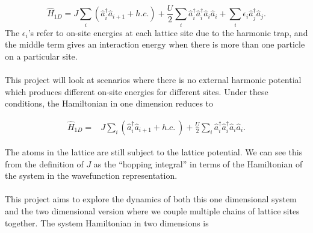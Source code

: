 \documentclass[a4paper,10pt]{article}
\begin{document}
\begin{equation}
 \hat{H}_{1D}=J\sum_{i}(\hat{a}^\dagger_{i}\hat{a}_{i+1}+h.c.)+\frac{U}{2}\sum_{i}\hat{a}^\dagger_{i}\hat{a}^\dagger_{i}\hat{a}_{i}\hat{a}_{i}+\sum_{i}{\epsilon_i}\hat{a}^\dagger_{j}\hat{a}_{j}.
\end{equation}
The $\epsilon_i$'s refer to on-site energies at each lattice site due to the harmonic trap, and the middle term gives an interaction energy when there is more than one particle 
on a particular site.
\\\\
This project will look at scenarios where there is no external harmonic potential which produces different on-site energies for different sites.  
Under these conditions, the Hamiltonian in one dimension reduces to

\begin{equation}
\begin{align*}
\hat{H}_{1D}=&J\sum_{i}(\hat{a}^\dagger_{i}\hat{a}_{i+1}+h.c.\ ) +\frac{U}{2}\sum_{i}\hat{a}^\dagger_{i}\hat{a}^\dagger_{i}\hat{a}_{i}\hat{a}_{i}.
\end{align*}
\end{equation}

The atoms in the lattice are still subject to the lattice potential. We can see this from the definition of $J$ as the ``hopping integral'' in terms of the Hamiltonian of
the system in the wavefunction representation.
\\\\
This project aims to explore the dynamics of both this one dimensional system and the two dimensional version where we couple multiple chains of lattice sites together. The 
system Hamiltonian in two dimensions is
 
\end{document}
